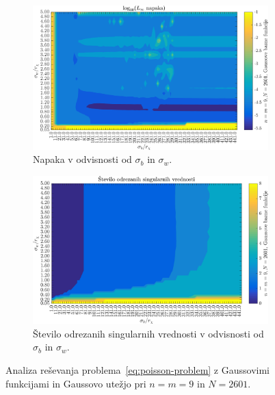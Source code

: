 \documentclass[12pt,a4paper,twoside]{article}
\theoremstyle{definition} %
\theoremstyle{plain} %
\numberwithin{equation}{section}
\begin{document}
\begin{figure}[h]
  \centering
  \begin{subfigure}[t]{0.45\textwidth}
    \includegraphics[width=\textwidth]{images/poisson_square_sigma_depedence_error.png}
    \caption{Napaka v odvisnosti od $\sigma_b$ in $\sigma_w$.}
    \label{fig:poisson-square-sigma-dep-error}
  \end{subfigure}
  \begin{subfigure}[t]{0.45\textwidth}
    \includegraphics[width=\textwidth]{images/poisson_square_sigma_depedence_cutoff.png}
    \caption[Število odrezanih singularnih vrednosti.]{Število odrezanih
    singularnih vrednosti v odvisnosti od $\sigma_b$ in $\sigma_w$.}
    \label{fig:poisson-square-sigma-dep-cutoff}
  \end{subfigure}
  \caption[Reševanja Poissonove enačbe z Gaussovimi funkcijami in utežjo.]{Analiza reševanja
  problema~\eqref{eq:poisson-problem} z Gaussovimi funkcijami in Gaussovo utežjo pri $n = m = 9$ in
  $N = 2601$.}
  \label{fig:poisson-square-sigma-dep}
\end{figure}
\end{document}
